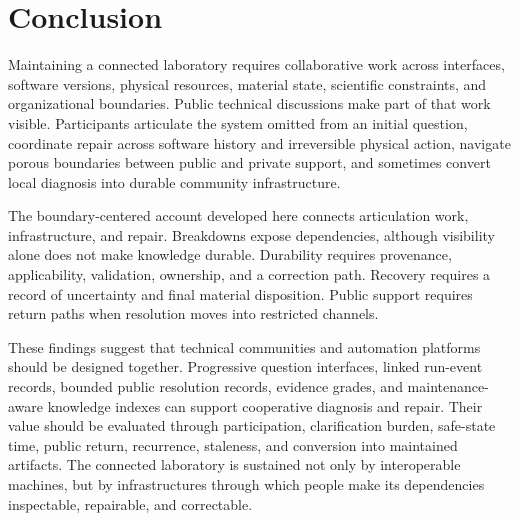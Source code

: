 \section{Conclusion}

Maintaining a connected laboratory requires collaborative work across interfaces, software versions, physical resources, material state, scientific constraints, and organizational boundaries. Public technical discussions make part of that work visible. Participants articulate the system omitted from an initial question, coordinate repair across software history and irreversible physical action, navigate porous boundaries between public and private support, and sometimes convert local diagnosis into durable community infrastructure.

The boundary-centered account developed here connects articulation work, infrastructure, and repair. Breakdowns expose dependencies, although visibility alone does not make knowledge durable. Durability requires provenance, applicability, validation, ownership, and a correction path. Recovery requires a record of uncertainty and final material disposition. Public support requires return paths when resolution moves into restricted channels.

These findings suggest that technical communities and automation platforms should be designed together. Progressive question interfaces, linked run-event records, bounded public resolution records, evidence grades, and maintenance-aware knowledge indexes can support cooperative diagnosis and repair. Their value should be evaluated through participation, clarification burden, safe-state time, public return, recurrence, staleness, and conversion into maintained artifacts. The connected laboratory is sustained not only by interoperable machines, but by infrastructures through which people make its dependencies inspectable, repairable, and correctable.
